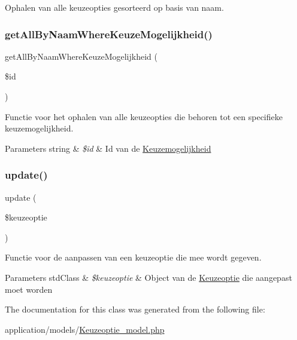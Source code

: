 Ophalen van alle keuzeopties gesorteerd op basis van naam. \mbox{\label{class_keuzeoptie___model_a6f3e4d26ab480501524eabb01683f5f7}} 
\subsubsection{\texorpdfstring{get\+All\+By\+Naam\+Where\+Keuze\+Mogelijkheid()}{getAllByNaamWhereKeuzeMogelijkheid()}}
{\footnotesize\ttfamily get\+All\+By\+Naam\+Where\+Keuze\+Mogelijkheid (\begin{DoxyParamCaption}\item[{}]{\$id }\end{DoxyParamCaption})}

Functie voor het ophalen van alle keuzeopties die behoren tot een specifieke keuzemogelijkheid. 
\begin{DoxyParams}[1]{Parameters}
string & {\em \$id} & Id van de \mbox{\hyperlink{class_keuzemogelijkheid}{Keuzemogelijkheid}} \\
\hline
\end{DoxyParams}
\mbox{\label{class_keuzeoptie___model_a9d98d1a6c3919a0e7b946d37fa385948}} 
\subsubsection{\texorpdfstring{update()}{update()}}
{\footnotesize\ttfamily update (\begin{DoxyParamCaption}\item[{}]{\$keuzeoptie }\end{DoxyParamCaption})}

Functie voor de aanpassen van een keuzeoptie die mee wordt gegeven. 
\begin{DoxyParams}[1]{Parameters}
std\+Class & {\em \$keuzeoptie} & Object van de \mbox{\hyperlink{class_keuzeoptie}{Keuzeoptie}} die aangepast moet worden \\
\hline
\end{DoxyParams}


The documentation for this class was generated from the following file\+:\begin{DoxyCompactItemize}
\item 
application/models/\mbox{\hyperlink{_keuzeoptie__model_8php}{Keuzeoptie\+\_\+model.\+php}}\end{DoxyCompactItemize}
